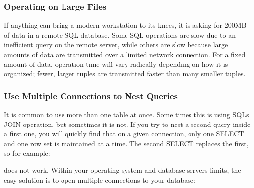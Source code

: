 \subsubsection{Operating on Large Files}

If anything can bring a modern workstation to its knees, it is asking
for 200MB of data in a remote SQL database. Some SQL operations are
slow due to an inefficient query on the remote server, while others are
slow because large amounts of data are transmitted over a limited
network connection. For a fixed amount of data, operation time will
vary radically depending on how it is organized; fewer, larger tuples
are transmitted faster than many smaller tuples.

\subsubsection{Use Multiple Connections to Nest Queries}

It is common to use more than one table at once. Some times this is
using SQL{\textquotesingle}s \textsf{JOIN} operation, but sometimes it
is not. If you try to nest a second query inside a first one, you will
quickly find that on a given connection, only one \textsf{SELECT} and
one row set is maintained at a time. The second \textsf{SELECT}
replaces the first, so for example:


\noindent
does not work. Within your operating system and database
server{\textquotesingle}s limits, the easy solution is to open multiple
connections to your database:


